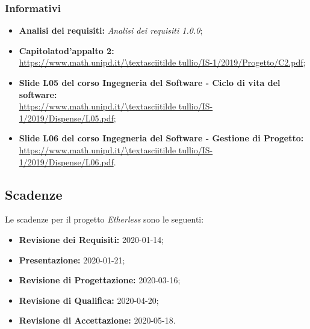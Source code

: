 \subsubsection{Informativi}
\begin{itemize}
	\item \textbf{Analisi dei requisiti:} \textit{Analisi dei requisiti 1.0.0}\docs;
    \item \textbf{Capitolato\glo d'appalto 2:}\\ 
			\url{https://www.math.unipd.it/\textasciitilde tullio/IS-1/2019/Progetto/C2.pdf};
	\item \textbf{Slide L05 del corso Ingegneria del Software - Ciclo di vita del software:} \\
			\url{https://www.math.unipd.it/\textasciitilde tullio/IS-1/2019/Dispense/L05.pdf};
	\item \textbf{Slide L06 del corso Ingegneria del Software - Gestione di Progetto:} \\
			\url{https://www.math.unipd.it/\textasciitilde tullio/IS-1/2019/Dispense/L06.pdf}.
\end{itemize}
\subsection{Scadenze}
Le scadenze per il progetto \textit{Etherless} sono le seguenti:
\begin{itemize}
	\item \textbf{Revisione dei Requisiti:} 2020-01-14;
	\item \textbf{Presentazione:} 2020-01-21;
	\item \textbf{Revisione di Progettazione:} 2020-03-16;
	\item \textbf{Revisione di Qualifica:} 2020-04-20;
	\item \textbf{Revisione di Accettazione:} 2020-05-18.
\end{itemize}
